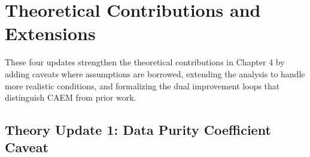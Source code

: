 \documentclass[11pt,a4paper]{article}
\begin{document}
\newpage

\section{Theoretical Contributions and Extensions}
\label{sec:theory}

These four updates strengthen the theoretical contributions in Chapter 4 by adding caveats where assumptions are borrowed, extending the analysis to handle more realistic conditions, and formalizing the dual improvement loops that distinguish CAEM from prior work.

\subsection{Theory Update 1: Data Purity Coefficient Caveat}
\end{document}
